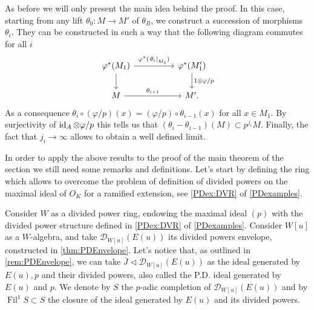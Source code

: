 \begin{rem}[]
	As before we will only present the main idea behind the proof.
	In this case, starting from any lift $\theta_0\colon M \to M'$
	of $\theta_B$, we construct a succession of morphisms \(\theta_i\).
	They can be constructed in such a way that the following diagram commutes for all \(i\)
	\begin{equation*}
	\begin{tikzcd}[column sep=4.8em]
		\varphi^*(M_1) \arrow[r, "\varphi^*(\left.\theta_i\right|_{ M_1 })", rightarrow] 
		\arrow[d, "", rightarrow] &
		\varphi^*(M_1') \arrow[d, "1 \otimes \varphi/p", rightarrow] \\
		M \arrow[r, "\theta_{ i+1 }", rightarrow] &
		M'.
	\end{tikzcd}
	\end{equation*}
	As a consequence \(\theta_i \circ (\varphi/p) (x) = (\varphi/p) \circ \theta_{ i-1 } (x)\)
	for all \(x \in M_1\).
	By surjectivity of \(\operatorname{id}_{ A } \otimes \varphi/p\) this
	tells us that \(\left( \theta_i - \theta_{ i-1 } \right)(M) \subset p^{ j_i }M\).
	Finally, the fact that $j_i \to \infty$ allows to obtain a well defined limit.
\end{rem}


\noindent
In order to apply the above results to the proof of the main theorem of the section
we still need some remarks and definitions.
Let's start by defining the ring which allows to overcome the problem of
definition of divided powers on the maximal ideal of $O_K$
for a ramified extension, see \cref{PDex:DVR} of \cref{PDexamples}.


\begin{defn}[]\label{defn:S}
	Consider $W$ as a divided power ring, endowing the maximal ideal $(p)$
	with the divided power structure defined in \cref{PDex:DVR} of \cref{PDexamples}.
	Consider $W[u]$ as a $W$-algebra, and take $\mathcal{D}_{W[u]}(E(u))$
	its divided powers envelope, constructed in \cref{thm:PDEnvelope}.
	Let's notice that, as outlined in \cref{rem:PDEnvelope},
	we can take $\overline{J} \triangleleft \mathcal{D}_{W[u]}(E(u))$ 
	as the ideal generated by $E(u), p$ and their divided powers,
	also called the P.D. ideal generated by $E(u)$ and $p$.
	We denote by $S$ the $p$-adic completion of $\mathcal{D}_{W[u]}(E(u))$
	and by $\operatorname{Fil}^1 S \subset S$ the closure of the ideal
	generated by $E(u)$ and its divided powers.
\end{defn}


